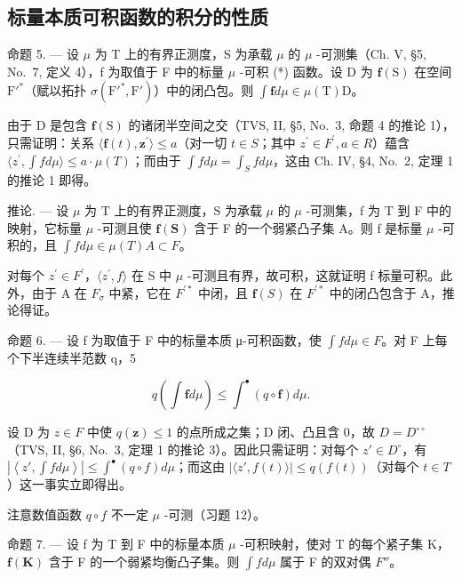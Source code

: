\subsection{标量本质可积函数的积分的性质}

命题 5. --- 设 \(\mu\) 为 T 上的有界正测度，S 为承载 \(\mu\) 的 \(\mu\) -可测集（Ch. V, §5, No.~7, 定义 4），f 为取值于 F 中的标量 \(\mu\) -可积 (*) 函数。设 D 为 \(\mathbf{f}(\mathrm{S})\) 在空间 \(\mathrm{F}'^*\)（赋以拓扑 \(\sigma(\mathrm{F}'^*, \mathrm{F}')\)）中的闭凸包。则 \(\int \mathbf{f} d\mu \in \mu(\mathrm{T})\mathrm{D}\)。

由于 D 是包含 \(\mathbf{f}(\mathrm{S})\) 的诸闭半空间之交（TVS, II, §5, No.~3, 命题 4 的推论 1），只需证明：关系 \(\langle\mathbf{f}(t),\mathbf{z}^{\prime}\rangle\leqslant a\)（对一切 \(t\in S\)；其中 \(z^{\prime}\in F^{\prime},a\in R\)）蕴含 \(\langle z^{\prime},\int f d\mu\rangle\leqslant a\cdot\mu(T)\)；而由于 \(\int f d\mu=\int_{S}f d\mu\)，这由 Ch. IV, §4, No.~2, 定理 1 的推论 1 即得。

推论. --- 设 \(\mu\) 为 T 上的有界正测度，S 为承载 \(\mu\) 的 \(\mu\) -可测集，f 为 T 到 F 中的映射，它标量 \(\mu\) -可测且使 \(\mathbf{f}(\mathbf{S})\) 含于 F 的一个弱紧凸子集 A。则 f 是标量 \(\mu\) -可积的，且 \(\int f d\mu \in \mu(T)A \subset F\)。

对每个 \(z^{\prime} \in F^{\prime}\)，\(\langle z^{\prime}, f \rangle\) 在 S 中 \(\mu\) -可测且有界，故可积，这就证明 f 标量可积。此外，由于 A 在 \(F_{\sigma}\) 中紧，它在 \(F^{\prime*}\) 中闭，且 \(\mathbf{f}(S)\) 在 \(F^{\prime*}\) 中的闭凸包含于 A，推论得证。

命题 6. --- 设 f 为取值于 F 中的标量本质 μ-可积函数，使 \(\int f d\mu \in F\)。对 F 上每个下半连续半范数 q，5

\[
q \left(\int \mathbf {f} d \mu\right) \leqslant \int^ {\bullet} (q \circ \mathbf {f}) d \mu .
\]

设 D 为 \(z \in F\) 中使 \(q(\mathbf{z}) \leqslant 1\) 的点所成之集；D 闭、凸且含 0，故 \(D = D^{\circ\circ}\)（TVS, II, §6, No.~3, 定理 1 的推论 3）。因此只需证明：对每个 \(z' \in D^{\circ}\)，有 \(\left|\left\langle z', \int f d\mu \right\rangle\right| \leqslant \int^{\bullet}(q \circ f) d\mu\)；而这由 \(|\langle z', f(t) \rangle| \leqslant q(f(t))\)（对每个 \(t \in T\)）这一事实立即得出。

注意数值函数 \(q \circ f\) 不一定 \(\mu\) -可测（习题 12）。

命题 7. --- 设 f 为 T 到 F 中的标量本质 \(\mu\) -可积映射，使对 T 的每个紧子集 K，\(\mathbf{f}(\mathbf{K})\) 含于 F 的一个弱紧均衡凸子集。则 \(\int f d\mu\) 属于 F 的双对偶 \(F''\)。

